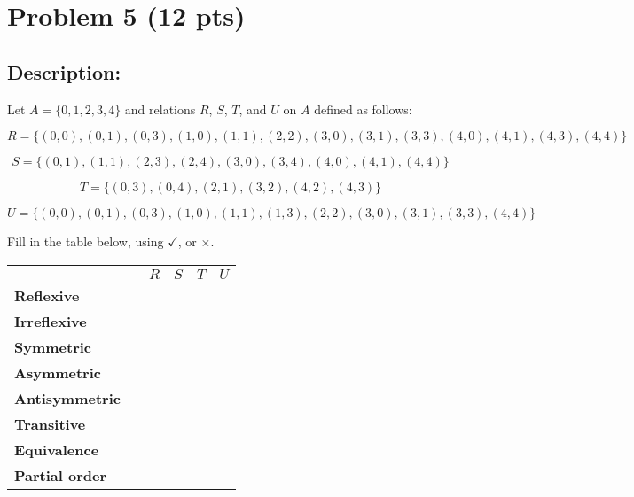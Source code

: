 \newpage

\section{Problem 5 (12 pts)}
\subsection{Description:}

\noindent Let $A = \{ 0, 1, 2, 3, 4 \}$ and relations $R$, $S$, $T$, and $U$ on $A$ defined as follows:

\[ R = \{ (0, 0),  (0, 1),  (0, 3),  (1, 0),  (1, 1),  (2, 2),  (3, 0),  (3, 1), (3, 3), (4, 0), (4, 1), (4, 3), (4, 4)  \}\]

\[ S = \{ (0, 1),  (1, 1),  (2, 3),  (2, 4), (3, 0), (3, 4), (4, 0), (4, 1), (4, 4)  \}\]

\[ T = \{ (0, 3), (0, 4),  (2, 1), (3, 2), (4, 2), (4, 3) \}\]

\[ U = \{ (0, 0),  (0, 1), (0, 3), (1, 0), (1, 1), (1, 3), (2, 2), (3, 0), (3, 1), (3, 3), (4, 4) \}\]

\noindent Fill in the table below, using $\checkmark$, or $\times$.

\begin{center}
\begin{tabular}{|l|l|l|l|l|l|}
\hline
						&	&	$R$	&	$S$	&	$T$	& $U$\\
\hline
\textbf{Reflexive} 	&   &		&		&	&	 \\
\hline
\textbf{Irreflexive} 	&   &		&		&	&	 \\
\hline
\textbf{Symmetric} 	&   &		&		&	&	 \\
\hline
\textbf{Asymmetric} 	&   &		&		&	&	 \\
\hline
\textbf{Antisymmetric} &   &		&		&	&	 \\
\hline
\textbf{Transitive} 	&   &		&		&	&	 \\
\hline
\textbf{Equivalence} 	&   &		&		&	&	 \\
\hline
\textbf{Partial order} 	&   &		&		&	&	 \\
\hline
\end{tabular}
\end{center}

